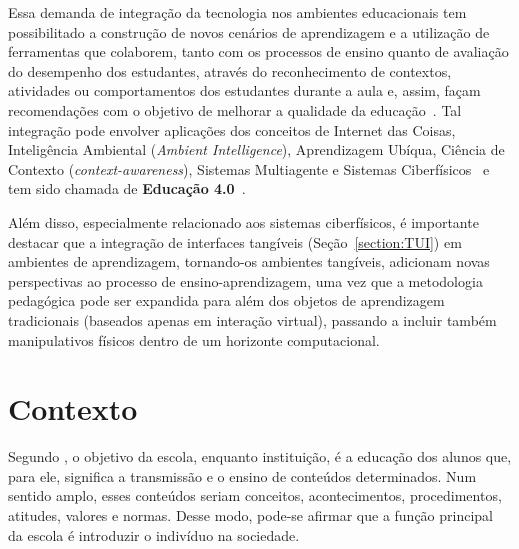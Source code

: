 Essa demanda de integração da tecnologia nos ambientes educacionais tem possibilitado a construção de novos cenários de aprendizagem e a utilização de ferramentas que colaborem, tanto com os processos de ensino quanto de avaliação do desempenho dos estudantes, através do reconhecimento de contextos, atividades ou comportamentos dos estudantes durante a aula e, assim, façam recomendações com o objetivo de melhorar a qualidade da educação~\citep{Cheng:2006,Dong:2007,Mathioudakis:2013}. Tal integração pode envolver aplicações dos conceitos de Internet das Coisas, Inteligência Ambiental ({\it Ambient Intelligence}), Aprendizagem Ubíqua, Ciência de Contexto ({\it context-awareness}), Sistemas Multiagente e Sistemas Ciberfísicos~\citep{Oluwagbemi:2014,Xue:2011} e tem sido chamada de \textbf{Educação 4.0}~\citep{Hussin2018}.

Além disso, especialmente relacionado aos sistemas ciberfísicos, é importante destacar que a integração de interfaces tangíveis (Seção~\ref{section:TUI}) em ambientes de aprendizagem, tornando-os ambientes tangíveis, adicionam novas perspectivas ao processo de ensino-aprendizagem, uma vez que a metodologia pedagógica pode ser expandida para além dos objetos de aprendizagem tradicionais (baseados apenas em interação virtual), passando a incluir também manipulativos físicos dentro de um horizonte computacional.


\section{Contexto}
\label{section:contexto}

Segundo \cite{bassedas:1996}, o objetivo da escola, enquanto instituição, é a educação dos alunos que, para ele, significa a transmissão e o ensino de conteúdos determinados. Num sentido amplo, esses conteúdos seriam conceitos, acontecimentos, procedimentos, atitudes, valores e normas. Desse modo, pode-se afirmar que a função principal da escola é introduzir o indivíduo na sociedade.


